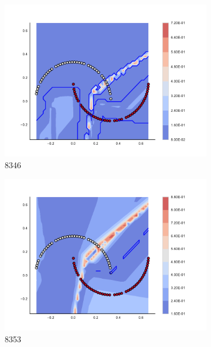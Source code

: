 \begin{figure}[h]
\begin{subfigure}[b]{0.09\textwidth}
    \includegraphics[clip, trim=2.35cm 1.75cm 4.5cm 0cm,width=\textwidth]{img/convergence/8346.pdf}
    \caption{8346}
    \label{fig:convergence_8346}
\end{subfigure}
%
\begin{subfigure}[b]{0.09\textwidth}
    \includegraphics[clip, trim=2.35cm 1.75cm 4.5cm 0cm,width=\textwidth]{img/convergence/8353.pdf}
    \caption{8353}
    \label{fig:convergence_8353}
\end{subfigure}
%
\begin{subfigure}[b]{0.09\textwidth}

\end{subfigure}
\end{figure}
